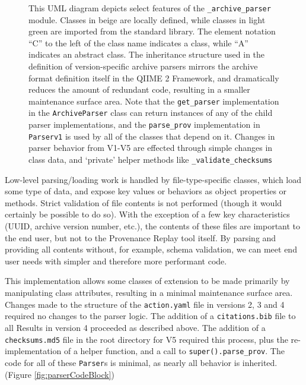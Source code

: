 \begin{figure}[htp]
\begin{minipage}[c]{0.5\textwidth}
    \end{minipage}\hfill
    \begin{minipage}[c]{0.45\textwidth}
\caption[UML Class diagram of the Version-specific Archive Parsers]%
{This UML diagram depicts select features of the \texttt{\_archive\_parser} module. Classes
in beige are locally defined, while classes in light green are imported from the
standard library. The element notation “C” to the left of the class name
indicates a class, while “A” indicates an abstract class. The inheritance
structure used in the definition of version-specific archive parsers mirrors the
archive format definition itself in the QIIME 2 Framework, and dramatically
reduces the amount of redundant code, resulting in a smaller maintenance surface
area. Note that the \texttt{get\_parser} implementation in the \texttt{ArchiveParser} class can
return instances of any of the child parser implementations, and the \texttt{parse\_prov}
implementation in \texttt{Parserv1} is used by all of the classes that depend on it.
Changes in parser behavior from V1-V5 are effected through simple changes in
class data, and ‘private’ helper methods like \texttt{\_validate\_checksums}}
    \end{minipage}
    \label{fig:archiveParsersUML}
\end{figure}

Low-level parsing/loading work is handled by file-type-specific classes, which
load some type of data, and expose key values or behaviors as object properties
or methods. Strict validation of file contents is not performed (though it would
certainly be possible to do so). With the exception of a few key characteristics
(UUID, archive version number, etc.), the contents of these files are important
to the end user, but not to the Provenance Replay tool itself. By parsing and
providing all contents without, for example, schema validation, we can meet end
user needs with simpler and therefore more performant code.

This implementation allows some classes of extension to be made primarily by
manipulating class attributes, resulting in a minimal maintenance surface area.
Changes made to the structure of the \texttt{action.yaml} file in versions 2, 3 and 4
required no changes to the parser logic. The addition of a \texttt{citations.bib} file to
all Results in version 4 proceeded as described above. The addition of a
\texttt{checksums.md5} file in the root directory for V5 required this process, plus the
re-implementation of a helper function, and a call to \texttt{super().parse\_prov}. The
code for all of these \texttt{Parser}s is minimal, as nearly all behavior is inherited. 
(Figure \ref{fig:parserCodeBlock})

